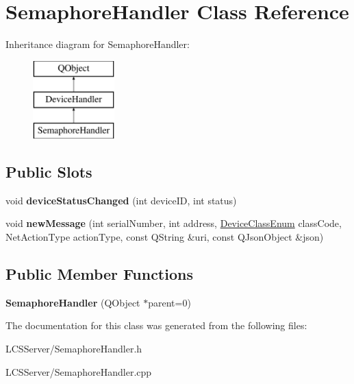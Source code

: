 \hypertarget{class_semaphore_handler}{}\section{Semaphore\+Handler Class Reference}
\label{class_semaphore_handler}
Inheritance diagram for Semaphore\+Handler\+:\begin{figure}[H]
\begin{center}
\leavevmode
\includegraphics[height=3.000000cm]{class_semaphore_handler}
\end{center}
\end{figure}
\subsection*{Public Slots}
\begin{DoxyCompactItemize}
\item 
\mbox{\label{class_semaphore_handler_a9ce184716d0da3e5ec71eb48fbe9a4ff}} 
void {\bfseries device\+Status\+Changed} (int device\+ID, int status)
\item 
\mbox{\label{class_semaphore_handler_afcbf5732d97a67cafc436a92d27824b1}} 
void {\bfseries new\+Message} (int serial\+Number, int address, \hyperlink{_global_defs_8h_ad17679fac69973be9b3a2787a60d7722}{Device\+Class\+Enum} class\+Code, Net\+Action\+Type action\+Type, const Q\+String \&uri, const Q\+Json\+Object \&json)
\end{DoxyCompactItemize}
\subsection*{Public Member Functions}
\begin{DoxyCompactItemize}
\item 
\mbox{\label{class_semaphore_handler_a22f4b37b071c987392f0ee52d862e08d}} 
{\bfseries Semaphore\+Handler} (Q\+Object $\ast$parent=0)
\end{DoxyCompactItemize}


The documentation for this class was generated from the following files\+:\begin{DoxyCompactItemize}
\item 
L\+C\+S\+Server/Semaphore\+Handler.\+h\item 
L\+C\+S\+Server/Semaphore\+Handler.\+cpp\end{DoxyCompactItemize}
